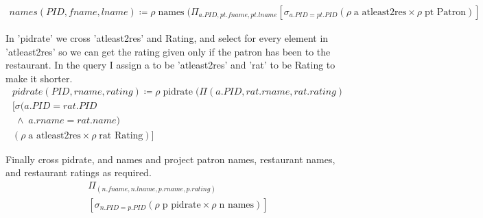 \documentclass{article}
\begin{document}
\begin{enumerate}
		\begin{align}
         names(PID,fname,lname) \coloneqq \rho \; \text{names} \;(\Pi_{a.PID, pt.fname, pt.lname} [\sigma_{a.PID = pt.PID} (\rho \; \text{a atleast2res} \times \rho \; \text{pt Patron})]          
		\end{align}
		
		In 'pidrate' we cross 'atleast2res' and Rating, and select for every element in 'atleast2res' so we can get the rating given only if the patron has been to the restaurant. In the query I assign a to be 'atleast2res' and 'rat' to be Rating to make it shorter.
		\begin{align}
          pidrate(PID,rname,rating)\coloneqq \rho \; \text{pidrate} \;(\Pi(a.PID, rat.rname, rat.rating)\\	[\sigma(a.PID = rat.PID \\ \; \wedge \; a.rname = rat.name) \\ (\rho \; \text{a atleast2res} \times \rho \; \text{rat Rating})]          
		\end{align}
		
		Finally cross pidrate, and names and project patron names, restaurant names, and restaurant ratings  as required.
		\begin{align}
               \Pi_{(n.fname, n.lname, p.rname, p.rating)} \\ [\sigma_{n.PID = p.PID} (\rho \; \text{p pidrate} \times \rho \; \text{n names})]  
		\end{align}


\end{enumerate}
\end{document}
